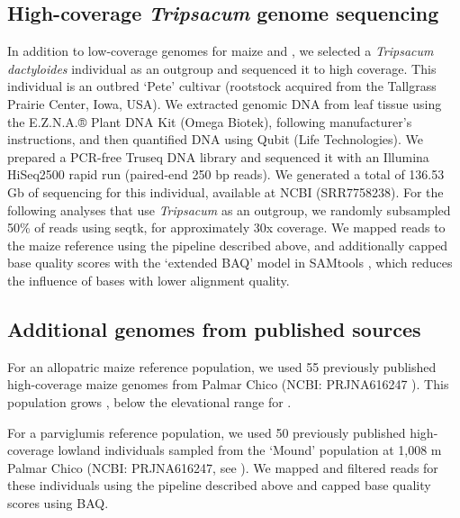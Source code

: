 \subsection*{High-coverage \textit{Tripsacum} genome sequencing}
In addition to low-coverage genomes for maize and \mexicana, we selected a \textit{Tripsacum dactyloides} individual as an outgroup and sequenced it to high coverage. This individual is an outbred ‘Pete' cultivar (rootstock acquired from the Tallgrass Prairie Center, Iowa, USA). We extracted genomic DNA from leaf tissue using the E.Z.N.A.® Plant DNA Kit (Omega Biotek), following manufacturer’s instructions, and then quantified DNA using Qubit (Life Technologies). We prepared a PCR-free Truseq DNA library and sequenced it with an Illumina HiSeq2500 rapid run (paired-end 250 bp reads). We generated a total of 136.53 Gb of sequencing for this individual, available at NCBI (SRR7758238). 
For the following analyses that use \textit{Tripsacum} as an outgroup, we randomly subsampled 50\% of reads using seqtk, for approximately 30x coverage. We mapped reads to the maize reference using the pipeline described above, and additionally capped base quality scores with the ‘extended BAQ' model in SAMtools \cite{Li:2011_BAQ}, which reduces the influence of bases with lower alignment quality.

\subsection*{Additional genomes from published sources}
For an allopatric maize reference population, we used 55 previously published high-coverage maize genomes from  Palmar Chico (NCBI: PRJNA616247 ). This  population grows , below the elevational range for \mexicana. 

For a parviglumis reference population, we used 50 previously published high-coverage lowland individuals sampled from the ‘Mound' population at 1,008 m  Palmar Chico  \cite{vanHeerwaarden:2010, Yang:2019, Chen:2020_maize55} (NCBI: PRJNA616247, see ). We mapped and filtered reads for these individuals using the pipeline described above and capped base quality scores using BAQ.


